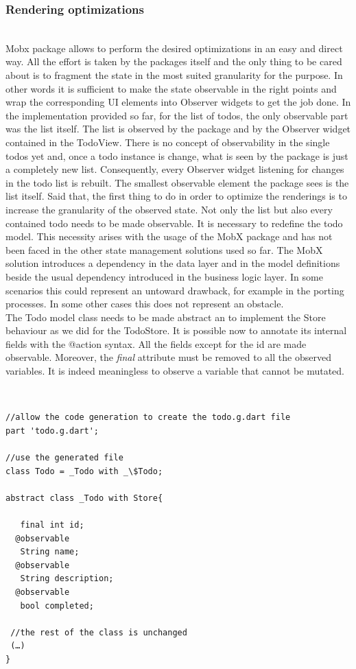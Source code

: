 \subsubsection{Rendering optimizations} \label{par:todo_app_inherited_widget_introduction}
\hfill\\
Mobx package allows to perform the desired optimizations in an easy and direct way. All the effort is taken by the packages itself and the only thing to be cared about is to fragment the state in the most suited granularity for the purpose. In other words it is sufficient to make the state observable in the right points and wrap the corresponding UI elements into Observer widgets to get the job done. In the implementation provided so far, for the list of todos, the only observable part was the list itself. The list is observed by the package and by the Observer widget contained in the TodoView. There is no concept of observability in the single todos yet and,  once a todo instance is change, what is seen by the package is just a completely new list. Consequently,  every Observer widget listening for changes in the todo list is rebuilt. The smallest observable element the package sees is the list itself. Said that, the first thing to do in order to optimize the renderings is to increase the granularity of the observed state. Not only the list but also every contained todo needs to be made observable. It is necessary to redefine the todo model. This necessity arises with the usage of the MobX package and has not been faced in the other state management solutions used so far. The MobX solution introduces a dependency in the data layer and in the model definitions beside the usual dependency introduced in the business logic layer. In some scenarios this could represent an untoward drawback, for example in the porting processes. In some other cases this does not represent an obstacle. \\
The Todo model class needs to be made abstract an to implement the Store behaviour as we did for the TodoStore. It is possible now to annotate its internal fields with the @action syntax. All the fields except for the id are made observable. Moreover, the \textit{final} attribute must be removed to all the observed variables. It is indeed meaningless to observe a variable that cannot be mutated.
\begin{code}
\mbox{}\\
 \mbox{}
		\label{code:2.14}
\begin{verbatim}
//allow the code generation to create the todo.g.dart file
part 'todo.g.dart';

//use the generated file
class Todo = _Todo with _\$Todo;

abstract class _Todo with Store{

   final int id;
  @observable
   String name;
  @observable
   String description;
  @observable
   bool completed;
   
 //the rest of the class is unchanged
 (…)
}
\end{verbatim}
\mbox{}
\end{code}

